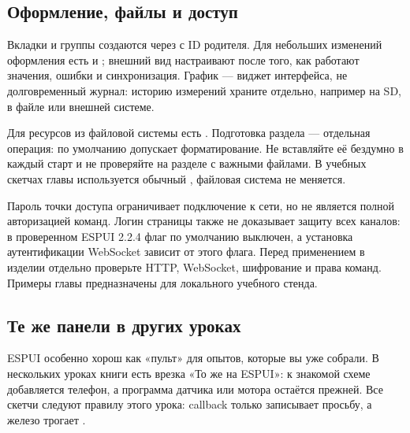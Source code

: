 \subsection{Оформление, файлы и доступ}

Вкладки и группы создаются через  с ID родителя.
Для небольших изменений оформления есть  и ;
внешний вид настраивают после того, как работают значения, ошибки и синхронизация.
График --- виджет интерфейса, не долговременный журнал: историю измерений храните отдельно,
например на SD, в файле или внешней системе.

Для ресурсов из файловой системы есть .
Подготовка раздела --- отдельная операция:  по умолчанию допускает
форматирование. Не вставляйте её бездумно в каждый старт и не проверяйте на разделе с важными файлами.
В учебных скетчах главы используется обычный , файловая система не меняется.

Пароль точки доступа ограничивает подключение к сети, но не является полной авторизацией команд.
Логин страницы также не доказывает защиту всех каналов: в проверенном ESPUI 2.2.4
флаг  по умолчанию выключен, а установка аутентификации WebSocket
зависит от этого флага. Перед применением в изделии отдельно проверьте HTTP, WebSocket,
шифрование и права команд. Примеры главы предназначены для локального учебного стенда.

\subsection{Те же панели в других уроках}

ESPUI особенно хорош как «пульт» для опытов, которые вы уже собрали. В нескольких уроках
книги есть врезка «То же на ESPUI»: к знакомой схеме добавляется телефон, а программа
датчика или мотора остаётся прежней. Все скетчи следуют правилу этого урока:
callback только записывает просьбу, а железо трогает .

